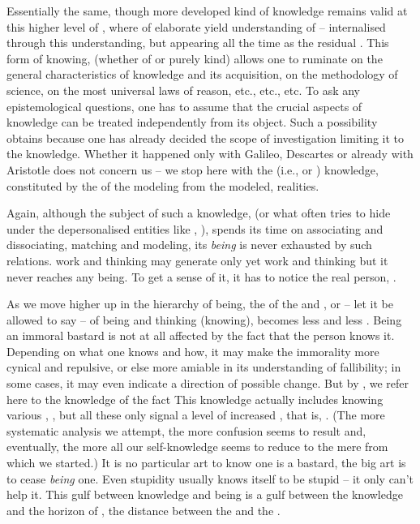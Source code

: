 \act Essentially the same, though more developed kind of knowledge remains valid
at this higher level of , where  of elaborate
 yield understanding of  -- internalised through
this understanding, but appearing all the time as the residual
.  This  form of knowing, 
(whether of  or purely  kind) allows one to
ruminate on the general characteristics of knowledge and its acquisition, on the
methodology of science, on the most universal laws of reason, etc., etc., etc.
To ask any epistemological questions, one has to assume that the crucial aspects
of knowledge can be treated independently from its object.  Such a possibility
obtains because one has already decided the scope of investigation limiting it
to the  knowledge.  Whether it happened only with Galileo,
Descartes or already with Aristotle does not concern us -- we stop here with the
 (i.e.,  or ) knowledge, constituted by
the  
of the  modeling from the modeled,  realities.

Again, although the subject of such a knowledge,  (or what often tries
to hide under the depersonalised entities like , ),
spends its time on associating and dissociating, matching and modeling, its
{\em being} is never exhausted by such relations.  work and
thinking may generate only yet  work and thinking but it never reaches
any being. To get a sense of it, it has to notice the real person, .

\mine %
As we move higher up in the hierarchy of being, the  of the
 and , or -- let it be allowed to say -- of being
and thinking (knowing), becomes less and less .  Being an immoral
bastard is not at all affected by the fact that the person knows it. Depending
on what one knows and how, it may make the immorality more cynical and
repulsive, or else more amiable in its understanding of fallibility; in some
cases, it may even indicate a direction of possible change.  But by , we refer here to the  knowledge of
the fact   This knowledge actually includes knowing various
, ,  but all these only signal a level of
increased , that is, . (The more systematic
analysis we attempt, the more confusion seems to result and, eventually, the
more all our self-knowledge seems to reduce to the mere  from which we
started.)  It is no particular art to know  one is a bastard, the big
art is to cease {\em being} one. Even stupidity usually knows itself to be
stupid -- it only can't help it. This gulf between knowledge and being is a gulf
between the  knowledge and the horizon of , the
distance between the  and the .


